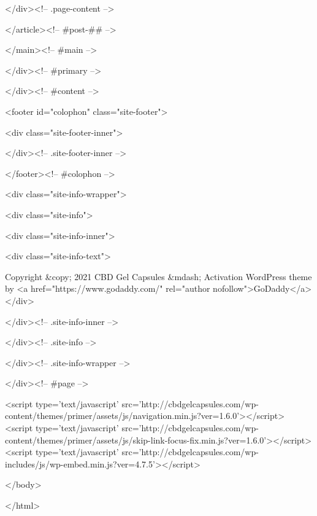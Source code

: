 </div><!-- .page-content -->

	
</article><!-- #post-## -->

			
		
	</main><!-- #main -->

</div><!-- #primary -->




		</div><!-- #content -->

		
		<footer id="colophon" class="site-footer">

			<div class="site-footer-inner">

				
			</div><!-- .site-footer-inner -->

		</footer><!-- #colophon -->

		
<div class="site-info-wrapper">

	<div class="site-info">

		<div class="site-info-inner">

			
<div class="site-info-text">

	Copyright &copy; 2021 CBD Gel Capsules &mdash; Activation WordPress theme by <a href="https://www.godaddy.com/" rel="author nofollow">GoDaddy</a>
</div>

		</div><!-- .site-info-inner -->

	</div><!-- .site-info -->

</div><!-- .site-info-wrapper -->

	</div><!-- #page -->

	<script type='text/javascript' src='http://cbdgelcapsules.com/wp-content/themes/primer/assets/js/navigation.min.js?ver=1.6.0'></script>
<script type='text/javascript' src='http://cbdgelcapsules.com/wp-content/themes/primer/assets/js/skip-link-focus-fix.min.js?ver=1.6.0'></script>
<script type='text/javascript' src='http://cbdgelcapsules.com/wp-includes/js/wp-embed.min.js?ver=4.7.5'></script>

</body>

</html>
